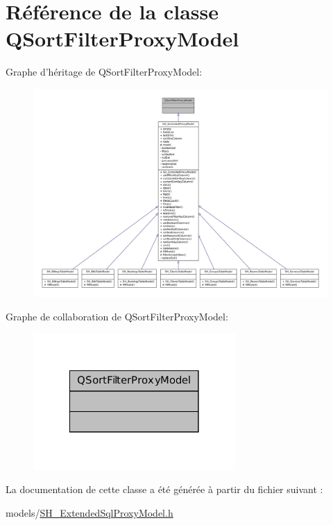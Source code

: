 \hypertarget{classQSortFilterProxyModel}{\section{Référence de la classe Q\-Sort\-Filter\-Proxy\-Model}
\label{classQSortFilterProxyModel}
}


Graphe d'héritage de Q\-Sort\-Filter\-Proxy\-Model\-:
\nopagebreak
\begin{figure}[H]
\begin{center}
\leavevmode
\includegraphics[width=350pt]{classQSortFilterProxyModel__inherit__graph}
\end{center}
\end{figure}


Graphe de collaboration de Q\-Sort\-Filter\-Proxy\-Model\-:
\nopagebreak
\begin{figure}[H]
\begin{center}
\leavevmode
\includegraphics[width=218pt]{classQSortFilterProxyModel__coll__graph}
\end{center}
\end{figure}


La documentation de cette classe a été générée à partir du fichier suivant \-:\begin{DoxyCompactItemize}
\item 
models/\hyperlink{SH__ExtendedSqlProxyModel_8h}{S\-H\-\_\-\-Extended\-Sql\-Proxy\-Model.\-h}\end{DoxyCompactItemize}
